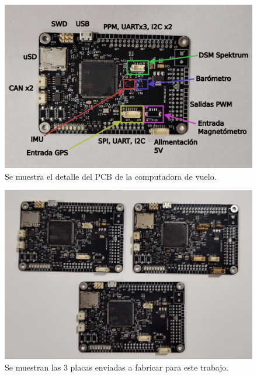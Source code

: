 \begin{figure}[H]
    \centering
    \includegraphics[width=\textwidth]{img/chori_detalle.png}
    \caption{Se muestra el detalle del PCB de la computadora de vuelo.}
    \label{fig:chori_detalle}    
\end{figure}

\begin{figure}[H]
    \centering
    \includegraphics[width=\textwidth]{img/choris_4.png}
    \caption{Se muestran las 3 placas enviadas a fabricar para este trabajo.}
    \label{fig:choris_4}
\end{figure}





